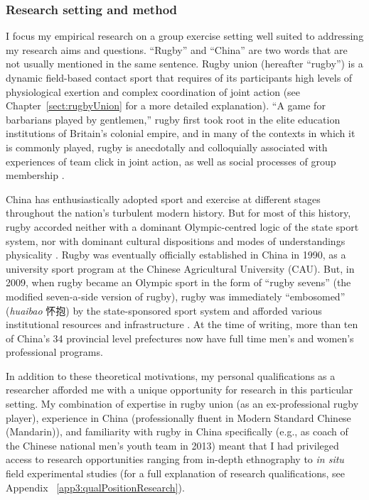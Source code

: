 \begin{CJK}{UTF8}{gbsn}
\subsubsection{Research setting and method}
I focus my empirical research on a group exercise setting well suited to addressing my research aims and questions.  ``Rugby'' and ``China'' are two words that are not usually mentioned in the same sentence.  Rugby union (hereafter ``rugby'') is a dynamic field-based contact sport that requires of its participants high levels of physiological exertion and complex coordination of joint action  (see Chapter~\ref{sect:rugbyUnion} for a more detailed explanation). ``A game for barbarians played by gentlemen,'' rugby first took root in the elite education institutions of Britain's colonial empire, and in many of the contexts in which it is commonly played, rugby is anecdotally and colloquially associated with experiences of team click in joint action, as well as social processes of group membership \citep{Dunning2005}.

China has enthusiastically adopted sport and exercise at different stages throughout the nation's turbulent modern history.  But for most of this history, rugby accorded neither with a dominant Olympic-centred logic of the state sport system, nor with dominant cultural dispositions and modes of understandings physicality \citep[which derived from hundreds of years of continuous history of Confucian and Daoist traditions of thought, see][]{Morris2004}.  Rugby was eventually officially established in China in 1990, as a university sport program at the Chinese Agricultural University (CAU).  But, in 2009, when rugby became an Olympic sport in the form of ``rugby sevens'' (the modified seven-a-side version of rugby), rugby was immediately ``embosomed'' (\textit{huaibao} 怀抱) by the state-sponsored sport system and afforded various institutional resources and infrastructure \citep{Xu2010}.  At the time of writing, more than ten of China's 34 provincial level prefectures now have full time men's and women's professional programs.

In addition to these theoretical motivations, my personal qualifications as a researcher afforded me with a unique opportunity for research in this particular setting.  My combination of expertise in rugby union (as an ex-professional rugby player), experience in China (professionally fluent in Modern Standard Chinese (Mandarin)), and familiarity with rugby in China specifically (e.g., as coach of the Chinese national men’s youth team in 2013) meant that I had privileged access to research opportunities ranging from in-depth ethnography to \textit{in situ} field experimental studies (for a full explanation of research qualifications, see Appendix ~\ref{app3:qualPositionResearch}).


\end{CJK}
